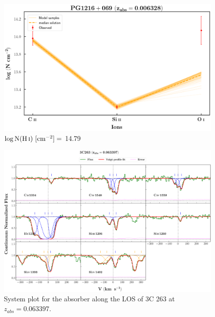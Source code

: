   \begin{figure}[!h]
    \centering
    \includegraphics[width=0.9\linewidth]{Ionisation-Modelling-Plots/pg1216-z=0.006328-compIII_logZ=1.png}
    \caption{$\log \text{N}(\ion{H}{i}) \ [\text{cm}^{-2}]=$ 14.79}
  \end{figure}
  
  \restoregeometry
  
  \newpage
  \thispagestyle{empty}

  \begin{landscape}
  
  \begin{figure}
      \centering
      \vspace{-10mm}
      \hspace*{-20mm}
      \includegraphics[width=1.1\linewidth]{System-Plots/3C263_z=0.063397_sys_plot.png}
      \caption{System plot for the absorber along the LOS of 3C 263 at $z_{abs} = 0.063397$. }
  \end{figure}
  
  \end{landscape}
  
